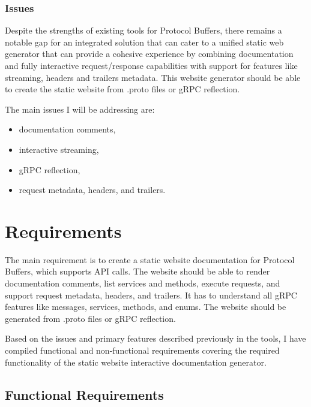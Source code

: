 \subsubsection{Issues}
Despite the strengths of existing tools for Protocol Buffers, there remains a notable gap for an integrated solution that can cater to a unified static web generator that can provide a cohesive experience by combining documentation and fully interactive request/response capabilities with support for features like streaming, headers and trailers metadata.
This website generator should be able to create the static website from .proto files or gRPC reflection.

The main issues I will be addressing are:
\begin{itemize}
    \item documentation comments,
    \item interactive streaming,
    \item gRPC reflection,
    \item request metadata, headers, and trailers.
\end{itemize}


\section{Requirements}
The main requirement is to create a static website documentation for Protocol Buffers, which supports API calls.
The website should be able to render documentation comments, list services and methods, execute requests, and support request metadata, headers, and trailers.
It has to understand all gRPC features like messages, services, methods, and enums.
The website should be generated from .proto files or gRPC reflection.

Based on the issues and primary features described previously in the tools, I have compiled functional and non-functional requirements covering the required functionality of the static website interactive documentation generator.

\subsection{Functional Requirements}
\newcommand{\functional}[1]{%
    \stepcounter{fcounter}%
    \textcolor{heading}{\textbf{#1}}\\%
}

